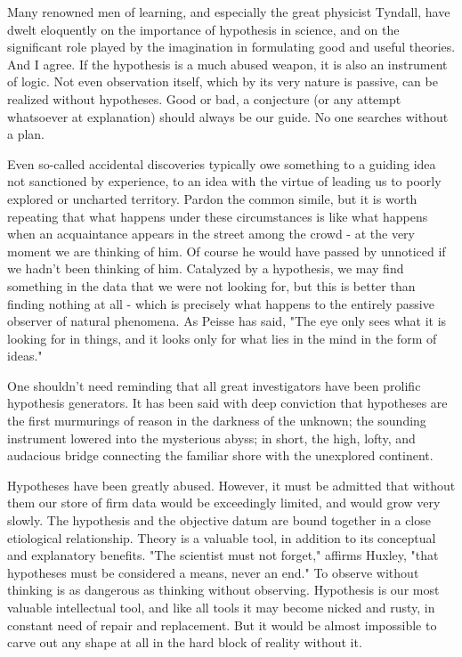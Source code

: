 \documentclass{article}
\begin{document}
Many renowned men of learning, and especially the great physicist Tyndall, have dwelt eloquently on the importance of hypothesis in science, and on the significant role played by the imagination in formulating good and useful theories. And I agree. If the hypothesis is a much abused weapon, it is also an instrument of logic. Not even observation itself, which by its very nature is passive, can be realized without hypotheses. Good or bad, a conjecture (or any attempt whatsoever at explanation) should always be our guide. No one searches without a plan.

Even so-called accidental discoveries typically owe something to a guiding idea not sanctioned by experience, to an idea with the virtue of leading us to poorly explored or uncharted territory. Pardon the common simile, but it is worth repeating that what happens under these circumstances is like what happens when an acquaintance appears in the street among the crowd - at the very moment we are thinking of him. Of course he would have passed by unnoticed if we hadn’t been thinking of him. Catalyzed by a hypothesis, we may find something in the data that we were not looking for, but this is better than finding nothing at all - which is precisely what happens to the entirely passive observer of natural phenomena. As Peisse has said, "The eye only sees what it is looking for in things, and it looks only for what lies in the mind in the form of ideas."

One shouldn’t need reminding that all great investigators have been prolific hypothesis generators. It has been said with deep conviction that hypotheses are the first murmurings of reason in the darkness of the unknown; the sounding instrument lowered into the mysterious abyss; in short, the high, lofty, and audacious bridge connecting the familiar shore with the unexplored continent.

Hypotheses have been greatly abused. However, it must be admitted that without them our store of firm data would be exceedingly limited, and would grow very slowly. The hypothesis and the objective datum are bound together in a close etiological relationship. Theory is a valuable tool, in addition to its conceptual and explanatory benefits. "The scientist must not forget," affirms Huxley, "that hypotheses must be considered a means, never an end." To observe without thinking is as dangerous as thinking without observing. Hypothesis is our most valuable intellectual tool, and like all tools it may become nicked and rusty, in constant need of repair and replacement. But it would be almost impossible to carve out any shape at all in the hard block of reality without it.
\end{document}
